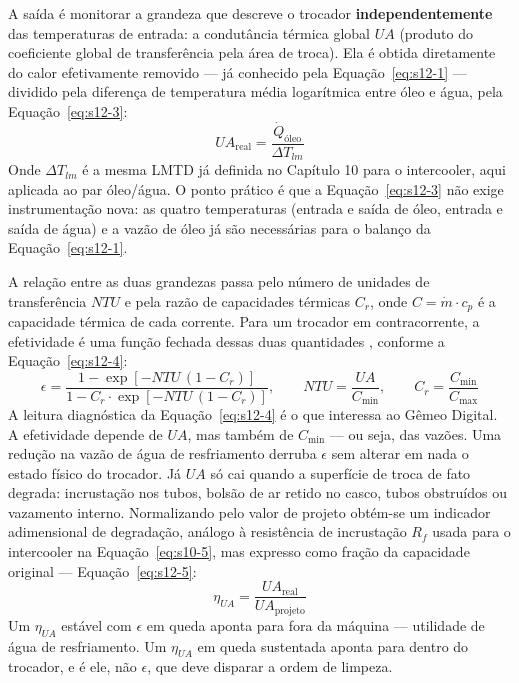 \documentclass[12pt,a4paper]{article}
\numberwithin{equation}{section}
\numberwithin{table}{section}
\numberwithin{figure}{section}
\begin{document}
{	A saída é monitorar a grandeza que descreve o trocador \textbf{independentemente} das temperaturas de entrada: a condutância térmica global $UA$ (produto do coeficiente global de transferência pela área de troca). Ela é obtida diretamente do calor efetivamente removido — já conhecido pela Equação~\eqref{eq:s12-1} — dividido pela diferença de temperatura média logarítmica entre óleo e água, pela Equação~\eqref{eq:s12-3}:
	\begin{equation}\label{eq:s12-3}
	UA_{\text{real}} = \frac{\dot{Q}_{\text{óleo}}}{\Delta T_{lm}}
	\end{equation}
	Onde $\Delta T_{lm}$ é a mesma LMTD já definida no Capítulo 10 para o intercooler, aqui aplicada ao par óleo/água. O ponto prático é que a Equação~\eqref{eq:s12-3} não exige instrumentação nova: as quatro temperaturas (entrada e saída de óleo, entrada e saída de água) e a vazão de óleo já são necessárias para o balanço da Equação~\eqref{eq:s12-1}.

	A relação entre as duas grandezas passa pelo número de unidades de transferência $NTU$ e pela razão de capacidades térmicas $C_r$, onde $C = \dot{m} \cdot c_p$ é a capacidade térmica de cada corrente. Para um trocador em contracorrente, a efetividade é uma função fechada dessas duas quantidades \cite{incropera}, conforme a Equação~\eqref{eq:s12-4}:
	\begin{equation}\label{eq:s12-4}
	\epsilon = \frac{1 - \exp\left[-NTU\,(1 - C_r)\right]}{1 - C_r \cdot \exp\left[-NTU\,(1 - C_r)\right]}, \qquad NTU = \frac{UA}{C_{\min}}, \qquad C_r = \frac{C_{\min}}{C_{\max}}
	\end{equation}
	A leitura diagnóstica da Equação~\eqref{eq:s12-4} é o que interessa ao Gêmeo Digital. A efetividade depende de $UA$, mas também de $C_{\min}$ — ou seja, das vazões. Uma redução na vazão de água de resfriamento derruba $\epsilon$ sem alterar em nada o estado físico do trocador. Já $UA$ só cai quando a superfície de troca de fato degrada: incrustação nos tubos, bolsão de ar retido no casco, tubos obstruídos ou vazamento interno. Normalizando pelo valor de projeto obtém-se um indicador adimensional de degradação, análogo à resistência de incrustação $R_f$ usada para o intercooler na Equação~\eqref{eq:s10-5}, mas expresso como fração da capacidade original — Equação~\eqref{eq:s12-5}:
	\begin{equation}\label{eq:s12-5}
	\eta_{UA} = \frac{UA_{\text{real}}}{UA_{\text{projeto}}}
	\end{equation}
	Um $\eta_{UA}$ estável com $\epsilon$ em queda aponta para fora da máquina — utilidade de água de resfriamento. Um $\eta_{UA}$ em queda sustentada aponta para dentro do trocador, e é ele, não $\epsilon$, que deve disparar a ordem de limpeza.

}
\end{document}
